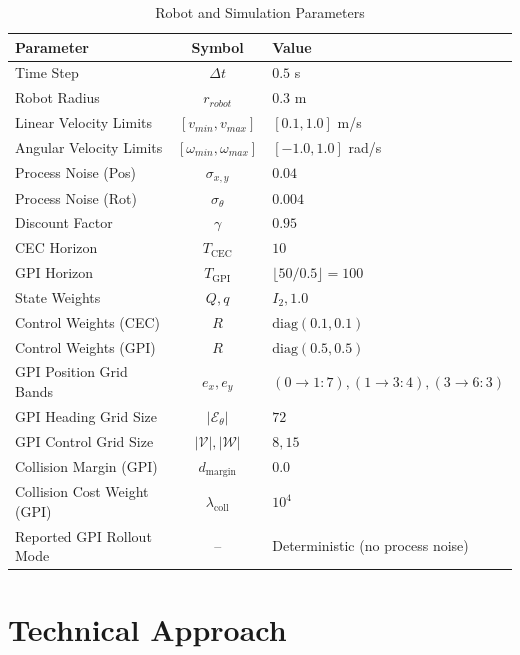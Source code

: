\documentclass[conference]{IEEEtran}
\begin{document}
\begin{table}[H]
    \centering
    \caption{Robot and Simulation Parameters}
    \label{tab:params}
    \begin{tabular}{|l|c|l|}
        \hline
        \textbf{Parameter} & \textbf{Symbol} & \textbf{Value} \\
        \hline
        Time Step & $\Delta t$ & $0.5$ s \\
        Robot Radius & $r_{robot}$ & $0.3$ m \\
        Linear Velocity Limits & $[v_{min}, v_{max}]$ & $[0.1, 1.0]$ m/s \\
        Angular Velocity Limits & $[\omega_{min}, \omega_{max}]$ & $[-1.0, 1.0]$ rad/s \\
        Process Noise (Pos) & $\sigma_{x,y}$ & $0.04$ \\
        Process Noise (Rot) & $\sigma_{\theta}$ & $0.004$ \\
        Discount Factor & $\gamma$ & $0.95$ \\
        CEC Horizon & $T_{\mathrm{CEC}}$ & $10$ \\
        GPI Horizon & $T_{\mathrm{GPI}}$ & $\lfloor 50/0.5 \rfloor = 100$ \\
        State Weights & $Q, q$ & $I_2, 1.0$ \\
        Control Weights (CEC) & $R$ & $\text{diag}(0.1, 0.1)$ \\
        Control Weights (GPI) & $R$ & $\text{diag}(0.5, 0.5)$ \\
        GPI Position Grid Bands & $e_{x},e_{y}$ & $(0\!\to\!1:7), (1\!\to\!3:4), (3\!\to\!6:3)$ \\
        GPI Heading Grid Size & $|\mathcal{E}_{\theta}|$ & $72$ \\
        GPI Control Grid Size & $|\mathcal{V}|, |\mathcal{W}|$ & $8, 15$ \\
        Collision Margin (GPI) & $d_{\mathrm{margin}}$ & $0.0$ \\
        Collision Cost Weight (GPI) & $\lambda_{\mathrm{coll}}$ & $10^4$ \\
        Reported GPI Rollout Mode & -- & Deterministic (no process noise) \\
        \hline
    \end{tabular}
\end{table}

\section{Technical Approach}
\end{document}
